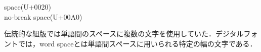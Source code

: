 \begin{description}
    \item[space(U+0020)]
    \item[no-break space(U+00A0)]
\end{description}

伝統的な組版では単語間のスペースに複数の文字を使用していた．デジタルフォントでは，word spaceとは単語間スペースに用いられる特定の幅の文字である\cite{docs.microsoft.com:en-us/typography/develop/character-design-standards/whitespace}．

